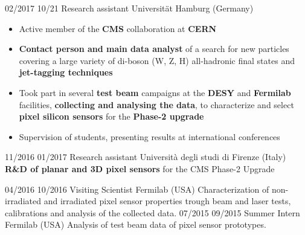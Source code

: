     \position
      {02/2017 \textemdash{} 10/21}
      {Research assistant}
      {Universit\"{a}t Hamburg (Germany)}
      {\begin{itemize}
\item Active member of the {\bf CMS} collaboration at {\bf CERN}
\item {\bf Contact person and main data analyst} of a search for new particles covering a large variety of di-boson (W, Z, H) all-hadronic final states and {\bf  jet-tagging techniques}
\item Took part in several {\bf test beam} campaigns at the {\bf DESY} and {\bf Fermilab} facilities, {\bf collecting and analysing the data}, to characterize and select {\bf pixel silicon sensors} for the {\bf Phase-2 upgrade}
\item Supervision of students, presenting results at international conferences
\end{itemize}
}
    \position
      {11/2016 \textemdash{} 01/2017}
      {Research assistant}
      {Universit\`a degli studi di Firenze (Italy)}
      {{\bf R\&D of planar and 3D pixel sensors} for the CMS Phase-2  Upgrade}

    \position
      {04/2016 \textemdash{} 10/2016}
      {Visiting Scientist}
      {Fermilab (USA)}
      {Characterization of non-irradiated and irradiated pixel sensor properties trough beam and laser tests, calibrations and analysis of the collected data.}
    \position
      {07/2015 \textemdash{} 09/2015}
      {Summer Intern}
      {Fermilab (USA)}
      {Analysis of test beam data of pixel sensor prototypes.}
\fi
